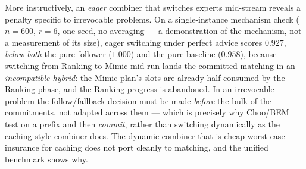 More instructively, an \emph{eager} combiner that switches experts
mid-stream reveals a penalty specific to irrevocable problems. On a
single-instance mechanism check (\(n=600\), \(r=6\), one seed, no
averaging --- a demonstration of the mechanism, not a measurement of its
size), eager switching under perfect advice scores \(0.927\),
\emph{below both} the pure follower (\(1.000\)) and the pure baseline
(\(0.958\)), because switching from Ranking to Mimic mid-run lands the
committed matching in an \emph{incompatible hybrid}: the Mimic plan's
slots are already half-consumed by the Ranking phase, and the Ranking
progress is abandoned. In an irrevocable problem the follow/fallback
decision must be made \emph{before} the bulk of the commitments, not
adapted across them --- which is precisely why Choo/BEM test on a prefix
and then \emph{commit}, rather than switching dynamically as the
caching-style combiner does. The dynamic combiner that is cheap
worst-case insurance for caching does not port cleanly to matching, and
the unified benchmark shows why.
